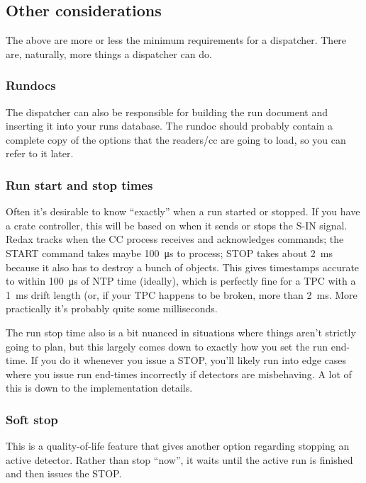 \subsection{Other considerations}

The above are more or less the minimum requirements for a dispatcher.
There are, naturally, more things a dispatcher can do.

\subsubsection{Rundocs}

The dispatcher can also be responsible for building the run document and inserting it into your runs database.
The rundoc should probably contain a complete copy of the options that the readers/cc are going to load, so you can refer to it later.

\subsubsection{Run start and stop times}

Often it's desirable to know ``exactly'' when a run started or stopped.
If you have a crate controller, this will be based on when it sends or stops the S-IN signal.
Redax tracks when the CC process receives and acknowledges commands; the START command takes maybe \SI{100}{\micro\second} to process; STOP takes about \SI{2}{\milli\second} because it also has to destroy a bunch of objects.
This gives timestamps accurate to within \SI{100}{\micro\second} of NTP time (ideally), which is perfectly fine for a TPC with a \SI{1}{\milli\second} drift length (or, if your TPC happens to be broken, more than \SI{2}{\milli\second}.
More practically it's probably quite some milliseconds.

The run stop time also is a bit nuanced in situations where things aren't strictly going to plan, but this largely comes down to exactly how you set the run end-time.
If you do it whenever you issue a STOP, you'll likely run into edge cases where you issue run end-times incorrectly if detectors are misbehaving.
A lot of this is down to the implementation details.

\subsubsection{Soft stop}

This is a quality-of-life feature that gives another option regarding stopping an active detector.
Rather than stop ``now'', it waits until the active run is finished and then issues the STOP.

